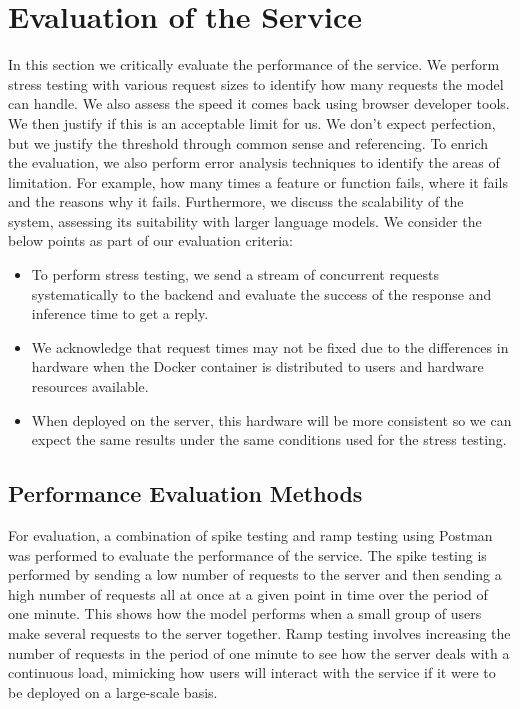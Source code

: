 \documentclass{surreydissertation}
\begin{document}
\section{Evaluation of the Service}
\label{sec:eval}
In this section we critically evaluate the performance of the service. We perform stress testing with various request sizes to identify how many requests the model can handle. We also assess the speed it comes back using browser developer tools. We then justify if this is an acceptable limit for us. We don’t expect perfection, but we justify the threshold through common sense and referencing. To enrich the evaluation, we also perform error analysis techniques to identify the areas of limitation. For example, how many times a feature or function fails, where it fails and the reasons why it fails. Furthermore, we discuss the scalability of the system, assessing its suitability with larger language models. We consider the below points as part of our evaluation criteria:

\begin{itemize}
    \item To perform stress testing, we send a stream of concurrent requests systematically to the backend and evaluate the success of the response and inference time to get a reply.
    \item We acknowledge that request times may not be fixed due to the differences in hardware when the Docker container is distributed to users and hardware resources available.
    \item When deployed on the server, this hardware will be more consistent so we can expect the same results under the same conditions used for the stress testing.
\end{itemize}

\subsection{Performance Evaluation Methods}
For evaluation, a combination of spike testing and ramp testing using Postman~\cite{postman} was performed to evaluate the performance of the service. The spike testing is performed by sending a low number of requests to the server and then sending a high number of requests all at once at a given point in time over the period of one minute. This shows how the model performs when a small group of users make several requests to the server together. Ramp testing involves increasing the number of requests in the period of one minute to see how the server deals with a continuous load, mimicking how users will interact with the service if it were to be deployed on a large-scale basis. 
\end{document}
